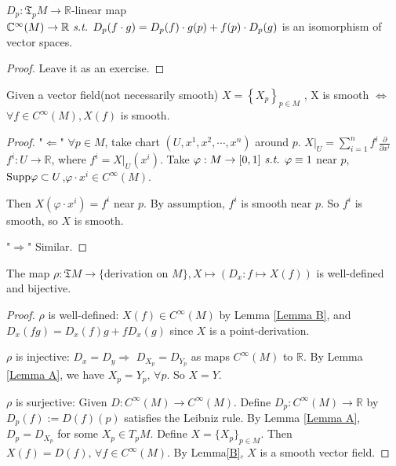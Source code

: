 \begin{lemma}\label{Lemma A}
    $D_p:\mathfrak{T}_p{M} \rightarrow \mathbb{R}$-linear map $\mathbb{C}^\infty(M)\rightarrow\mathbb{R} \textit{ s.t. } D_p(f\cdot g)=D_p(f)\cdot g(p)+f(p)\cdot D_p(g)$ is an isomorphism of vector spaces.
\end{lemma}
\begin{proof}

     Leave it as an exercise.
\end{proof}
\begin{lemma}\label{Lemma B}
    Given a vector field(not necessarily smooth) $X=\left\{X_p\right\}_{p\in M}$ , X is smooth $\Leftrightarrow$ $\forall f \in C^\infty(M),X(f)$ is smooth.
\end{lemma}
\begin{proof}
    "$ \Leftarrow $" $\forall p\in M$, take chart $(U,x^1,x^2,\cdots,x^n)$ around $p$. $X|_U=\sum_{i=1}^{n}{f^i\frac{\partial}{\partial x^i}}$  $f^i:U\rightarrow \mathbb{R}$, where $f^i=X|_U(x^i)$.
    Take $\varphi:M\rightarrow [0,1] \textit{ s.t. } \varphi \equiv 1 $ near $p$, $\mathrm{Supp} \varphi\subset U$,$\varphi \cdot x^i\in C^\infty(M)$.
    
    Then $X(\varphi \cdot x^i)=f^i$ near $p$. By assumption, $f^i$ is smooth near $p$. So $f^i$ is smooth, so $X$ is smooth.
    
     "$ \Rightarrow $" Similar.
\end{proof}
\begin{theorem}
    The map $\rho:\mathfrak{T}M\rightarrow \{\text{derivation on }M\},X\mapsto (D_x:f\mapsto X(f))$ is well-defined and bijective.
\end{theorem}
\begin{proof}
     $ \rho $ is well-defined: $ X(f)\in C^\infty(M) $ by Lemma \ref{Lemma B}, and  $ D_x(fg)=D_x(f)g+fD_x(g) $ since  $ X $ is a point-derivation.
     
      $ \rho $ is injective: $ D_x=D_y\Rightarrow $ $ D_{X_p}=D_{Y_p} $ as maps  $ C^\infty(M) $ to  $ \mathbb{R} $. By Lemma \ref{Lemma A}, we have  $ X_p=Y_p,\,\forall p $. So  $ X=Y $.  
      
       $ \rho $ is surjective: Given  $ D:C^\infty(M)\rightarrow C^\infty(M) $. Define  $ D_p:C^\infty(M)\rightarrow \mathbb{R} $ by  $ D_p(f):=D(f)(p) $ satisfies the Leibniz rule. By Lemma \ref{Lemma A},  $ D_p=D_{X_p} $ for some  $ X_p\in T_pM $. Define  $ X=\{X_p\}_{p\in M} $. Then  $ X(f)=D(f) ,\,\forall f\in C^\infty(M)$. By Lemma\ref{B},  $ X $ is a smooth vector field.    
\end{proof}
